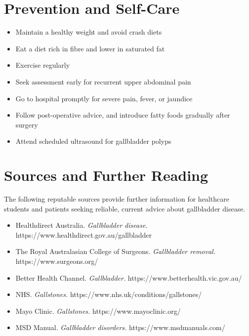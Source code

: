 \section*{Prevention and Self-Care}
\begin{itemize}
    \item Maintain a healthy weight and avoid crash diets
    \item Eat a diet rich in fibre and lower in saturated fat
    \item Exercise regularly
    \item Seek assessment early for recurrent upper abdominal pain
    \item Go to hospital promptly for severe pain, fever, or jaundice
    \item Follow post-operative advice, and introduce fatty foods gradually after surgery
    \item Attend scheduled ultrasound for gallbladder polyps
\end{itemize}

\section*{Sources and Further Reading}
The following reputable sources provide further information for healthcare students and patients seeking reliable, current advice about gallbladder disease.
\begin{itemize}
    \item Healthdirect Australia. \textit{Gallbladder disease.} https://www.healthdirect.gov.au/gallbladder
    \item The Royal Australasian College of Surgeons. \textit{Gallbladder removal.} https://www.surgeons.org/
    \item Better Health Channel. \textit{Gallbladder.} https://www.betterhealth.vic.gov.au/
    \item NHS. \textit{Gallstones.} https://www.nhs.uk/conditions/gallstones/
    \item Mayo Clinic. \textit{Gallstones.} https://www.mayoclinic.org/
    \item MSD Manual. \textit{Gallbladder disorders.} https://www.msdmanuals.com/
\end{itemize}
